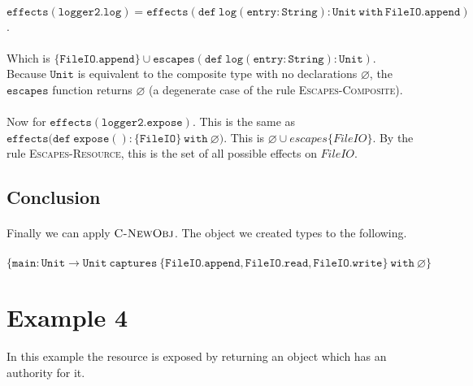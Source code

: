 \documentclass{llncs}
\newcommand{\keywadj}[1]{\mathtt{#1}}
\begin{document}
\paragraph{}
$\keywadj{effects(logger2.log)} = \keywadj{effects(def~log (entry : String) : Unit~with~FileIO.append)}$.

\paragraph{}
Which is $\keywadj{\{FileIO.append\} \cup escapes(def~log(entry : String) : Unit)}$. Because $\keywadj{Unit}$ is equivalent to the composite type with no declarations $\varnothing$, the $\keywadj{escapes}$ function returns $\varnothing$ (a degenerate case of the rule \textsc{Escapes-Composite}).

\paragraph{}
Now for $\keywadj{effects(logger2.expose)}$. This is the same as $\keywadj{effects(def~expose() : \{ FileIO \}~with~\varnothing})$. This is $\varnothing \cup escapes \{ FileIO \}$. By the rule \textsc{Escapes-Resource}, this is the set of all possible effects on $FileIO$.

\subsection*{Conclusion}

\paragraph{}
Finally we can apply $\textsc{C-NewObj}$. The object we created types to the following.

\paragraph{}
 $\keywadj{ \{ main : Unit \rightarrow Unit~captures~\{FileIO.append, FileIO.read, FileIO.write\} ~with~\varnothing \}}$

\section{Example 4}

\paragraph{}
In this example the resource is exposed by returning an object which has an authority for it.\\
\end{document}
